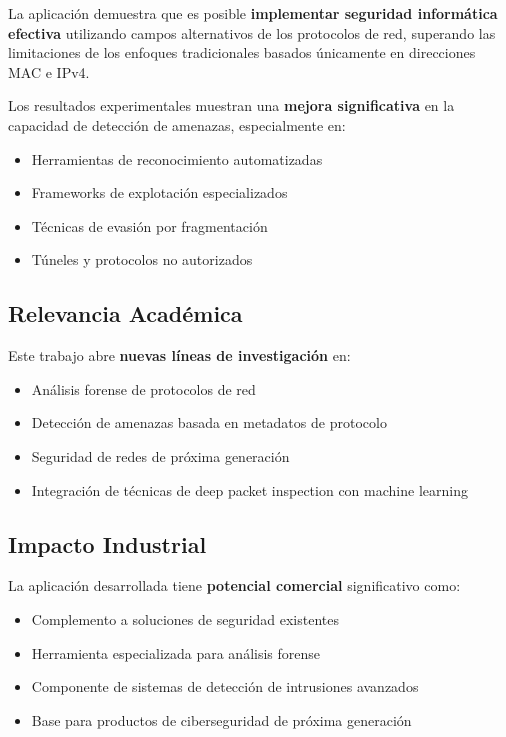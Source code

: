 \documentclass[12pt,a4paper]{article}
\begin{document}
La aplicación demuestra que es posible \textbf{implementar seguridad informática efectiva} utilizando campos alternativos de los protocolos de red, superando las limitaciones de los enfoques tradicionales basados únicamente en direcciones MAC e IPv4.

Los resultados experimentales muestran una \textbf{mejora significativa} en la capacidad de detección de amenazas, especialmente en:
\begin{itemize}
    \item Herramientas de reconocimiento automatizadas
    \item Frameworks de explotación especializados  
    \item Técnicas de evasión por fragmentación
    \item Túneles y protocolos no autorizados
\end{itemize}

\subsection{Relevancia Académica}

Este trabajo abre \textbf{nuevas líneas de investigación} en:
\begin{itemize}
    \item Análisis forense de protocolos de red
    \item Detección de amenazas basada en metadatos de protocolo
    \item Seguridad de redes de próxima generación
    \item Integración de técnicas de deep packet inspection con machine learning
\end{itemize}

\subsection{Impacto Industrial}

La aplicación desarrollada tiene \textbf{potencial comercial} significativo como:
\begin{itemize}
    \item Complemento a soluciones de seguridad existentes
    \item Herramienta especializada para análisis forense
    \item Componente de sistemas de detección de intrusiones avanzados
    \item Base para productos de ciberseguridad de próxima generación
\end{itemize}
\end{document}
